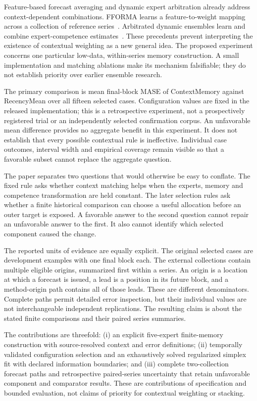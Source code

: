 \documentclass[11pt,a4paper]{article}
\begin{document}
Feature-based forecast averaging and dynamic expert arbitration already address context-dependent combinations. FFORMA learns a feature-to-weight mapping across a collection of reference series~\cite{fforma}. Arbitrated dynamic ensembles learn and combine expert-competence estimates~\cite{ade}. These precedents prevent interpreting the existence of contextual weighting as a new general idea. The proposed experiment concerns one particular low-data, within-series memory construction. A small implementation and matching ablations make its mechanism falsifiable; they do not establish priority over earlier ensemble research.

The primary comparison is mean final-block MASE of ContextMemory against RecencyMean over all fifteen selected cases. Configuration values are fixed in the released implementation; this is a retrospective experiment, not a prospectively registered trial or an independently selected confirmation corpus. An unfavorable mean difference provides no aggregate benefit in this experiment. It does not establish that every possible contextual rule is ineffective. Individual case outcomes, interval width and empirical coverage remain visible so that a favorable subset cannot replace the aggregate question.

The paper separates two questions that would otherwise be easy to conflate. The fixed rule asks whether context matching helps when the experts, memory and competence transformation are held constant. The later selection rules ask whether a finite historical comparison can choose a useful allocation before an outer target is exposed. A favorable answer to the second question cannot repair an unfavorable answer to the first. It also cannot identify which selected component caused the change.

The reported units of evidence are equally explicit. The original selected cases are development examples with one final block each. The external collections contain multiple eligible origins, summarized first within a series. An origin is a location at which a forecast is issued, a lead is a position in its future block, and a method-origin path contains all of those leads. These are different denominators. Complete paths permit detailed error inspection, but their individual values are not interchangeable independent replications. The resulting claim is about the stated finite comparisons and their paired series summaries.

The contributions are threefold: (i) an explicit five-expert finite-memory construction with source-resolved context and error definitions; (ii) temporally validated configuration selection and an exhaustively solved regularized simplex fit with declared information boundaries; and (iii) complete two-collection forecast paths and retrospective paired-series uncertainty that retain unfavorable component and comparator results. These are contributions of specification and bounded evaluation, not claims of priority for contextual weighting or stacking.
\end{document}

